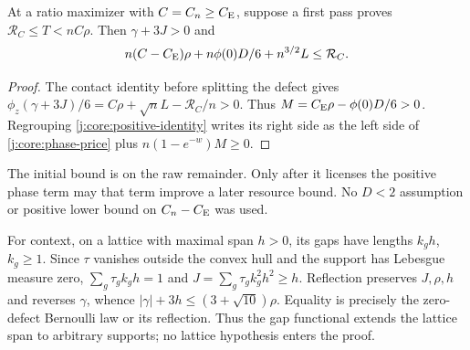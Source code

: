 \begin{corollary}\label{j:core:license}
At a ratio maximizer with $C=C_n\ge C_{\mathrm E}$, suppose a first pass proves
$\mathcal R_C\le T<nC\rho$. Then $\gamma+3J>0$ and
\begin{equation}\label{j:core:phase-price}
 n(C-C_{\mathrm E})\rho+n\phi(0)D/6+n^{3/2}L\le\mathcal R_C.
\end{equation}
\end{corollary}
\begin{proof}
The contact identity before splitting the defect gives
$\phi_z(\gamma+3J)/6=C\rho+\sqrt nL-\mathcal R_C/n>0$.
Thus $M=C_{\mathrm E}\rho-\phi(0)D/6>0$. Regrouping
\eqref{j:core:positive-identity} writes its right side as the left side
of \eqref{j:core:phase-price} plus $n(1-e^{-w})M\ge0$.
\end{proof}
The initial bound is on the raw remainder. Only after it licenses the
positive phase term may that term improve a later resource bound.
No $D<2$ assumption or positive lower bound on $C_n-C_{\mathrm E}$ was used.

For context, on a lattice with maximal span $h>0$, its gaps have lengths
$k_gh$, $k_g\ge1$. Since $\tau$ vanishes outside the convex hull and the
support has Lebesgue measure zero,
$\sum_g\tau_g k_gh=1$ and $J=\sum_g\tau_g k_g^2h^2\ge h$.
Reflection preserves $J,\rho,h$ and reverses $\gamma$, whence
$|\gamma|+3h\le(3+\sqrt{10})\rho$. Equality is precisely the zero-defect
Bernoulli law or its reflection. Thus the gap functional extends the
lattice span to arbitrary supports; no lattice hypothesis enters the proof.
